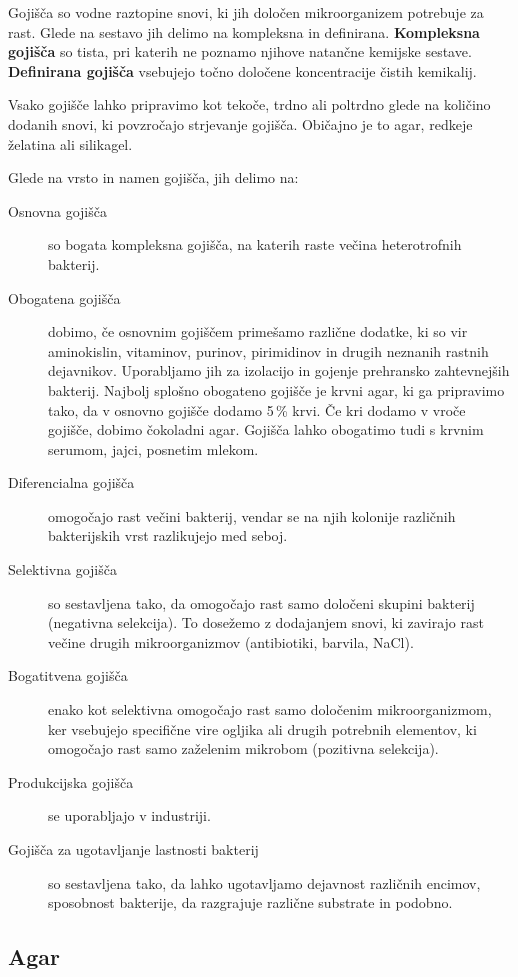 \documentclass[12pt, a4paper, oneside]{report}
\begin{document}
Gojišča so vodne raztopine snovi, ki jih določen mikroorganizem potrebuje za rast. Glede na sestavo jih delimo na kompleksna in definirana. \textbf{Kompleksna gojišča} so tista, pri katerih ne poznamo njihove natančne kemijske sestave. \textbf{Definirana gojišča} vsebujejo točno določene koncentracije čistih kemikalij.

Vsako gojišče lahko pripravimo kot tekoče, trdno ali poltrdno glede na količino dodanih snovi, ki povzročajo strjevanje gojišča. Običajno je to agar, redkeje želatina ali silikagel.

Glede na vrsto in namen gojišča, jih delimo na:
\begin{description}
\item[Osnovna gojišča] so bogata kompleksna gojišča, na katerih raste večina heterotrofnih bakterij.
\item[Obogatena gojišča] dobimo, če osnovnim gojiščem primešamo različne dodatke, ki so vir aminokislin, vitaminov, purinov, pirimidinov in drugih neznanih rastnih dejavnikov. Uporabljamo jih za izolacijo in gojenje prehransko zahtevnejših bakterij. Najbolj splošno obogateno gojišče je krvni agar, ki ga pripravimo tako, da v osnovno gojišče dodamo 5\,\% krvi. Če kri dodamo v vroče gojišče, dobimo čokoladni agar. Gojišča lahko obogatimo tudi s krvnim serumom, jajci, posnetim mlekom.
\item[Diferencialna gojišča] omogočajo rast večini bakterij, vendar se na njih kolonije različnih bakterijskih vrst razlikujejo med seboj.
\item[Selektivna gojišča] so sestavljena tako, da omogočajo rast samo določeni skupini bakterij (negativna selekcija). To dosežemo z dodajanjem snovi, ki zavirajo rast večine drugih mikroorganizmov (antibiotiki, barvila, NaCl).
\item[Bogatitvena gojišča] enako kot selektivna omogočajo rast samo določenim mikroorganizmom, ker vsebujejo specifične vire ogljika ali drugih potrebnih elementov, ki omogočajo rast samo zaželenim mikrobom (pozitivna selekcija).
\item[Produkcijska gojišča] se uporabljajo v industriji.
\item[Gojišča za ugotavljanje lastnosti bakterij] so sestavljena tako, da lahko ugotavljamo dejavnost različnih encimov, sposobnost bakterije, da razgrajuje različne substrate in podobno.
\end{description}

\subsection{Agar}
\end{document}
